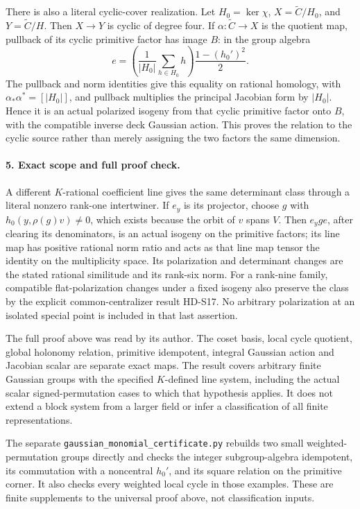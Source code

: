 There is also a literal cyclic-cover realization. Let
\(H_0=\ker\chi\), \(X=\widetilde C/H_0\), and
\(Y=\widetilde C/H\). Then \(X\to Y\) is cyclic of degree
four. If \(\alpha:\widetilde C\to X\) is the quotient map,
pullback of its cyclic primitive factor has image \(B\):
in the group algebra
\[
 e=\left(\frac1{|H_0|}\sum_{h\in H_0}h\right)
                              \frac{1-(h_0')^2}{2}.
\]
The pullback and norm identities give this equality on rational
homology, with \(\alpha_*\alpha^*=[|H_0|]\), and pullback
multiplies the principal Jacobian form by \(|H_0|\). Hence it
is an actual polarized isogeny from that cyclic primitive factor
onto \(B\), with the compatible inverse deck Gaussian action.
This proves the relation to the cyclic source rather than merely
assigning the two factors the same dimension.

\paragraph{5. Exact scope and full proof check.}
A different \(K\)-rational coefficient line gives the same
determinant class through a literal nonzero rank-one intertwiner.
If \(e_y\) is its projector, choose \(g\) with
\(h_0(y,\rho(g)v)\ne0\), which exists because the orbit of
\(v\) spans \(V\). Then \(e_yg e\), after clearing its
denominators, is an actual isogeny on the primitive factors;
its line map has positive rational norm ratio and acts as that
line map tensor the identity on the multiplicity space. Its
polarization and determinant changes are the stated rational
similitude and its rank-six norm. For a rank-nine family,
compatible flat-polarization changes under a fixed isogeny also
preserve the class by the explicit common-centralizer result
HD-S17. No arbitrary polarization at an isolated special point
is included in that last assertion.

The full proof above was read by its author. The coset basis,
local cycle quotient, global holonomy relation, primitive
idempotent, integral Gaussian action and Jacobian scalar are
separate exact maps. The result covers arbitrary finite
Gaussian groups with the specified \(K\)-defined line system,
including the actual scalar signed-permutation cases to which
that hypothesis applies. It does not extend a block system
from a larger field or infer a classification of all finite
representations.

The separate \texttt{gaussian\_monomial\_certificate.py}
rebuilds two small weighted-permutation groups directly and
checks the integer subgroup-algebra idempotent, its commutation
with a noncentral \(h_0'\), and its square relation on the
primitive corner. It also checks every weighted local cycle
in those examples. These are finite supplements to the
universal proof above, not classification inputs.

